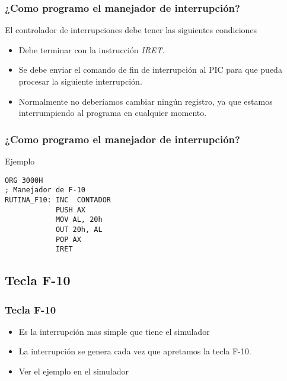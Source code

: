 \documentclass{beamer}
\begin{document}
\begin{frame}[fragile]
\frametitle{¿Como programo el manejador de interrupción?}

El controlador de interrupciones debe tener las siguientes condiciones
\begin{itemize} 
 \item Debe terminar con la instrucción \emph{IRET}.
 \item Se debe enviar el comando de fin de interrupción al PIC para que pueda procesar la siguiente interrupción.
 \item Normalmente no deberíamos cambiar ningún registro, ya que estamos interrumpiendo al programa en cualquier momento.
\end{itemize}
\end{frame}

\begin{frame}[fragile]
\frametitle{¿Como programo el manejador de interrupción?}
\begin{block}{Ejemplo}
\begin{verbatim}
ORG 3000H
; Manejador de F-10
RUTINA_F10: INC  CONTADOR
            PUSH AX
            MOV AL, 20h
            OUT 20h, AL
            POP AX
            IRET
\end{verbatim}
\end{block}

\end{frame}


\subsection{Tecla F-10}
\begin{frame}
\frametitle{Tecla F-10}
\begin{itemize}
 \item Es la interrupción mas simple que tiene el simulador
 \item La interrupción se genera cada vez que apretamos la tecla F-10.
 \item Ver el ejemplo en el simulador
\end{itemize}

\end{frame}
\end{document}
